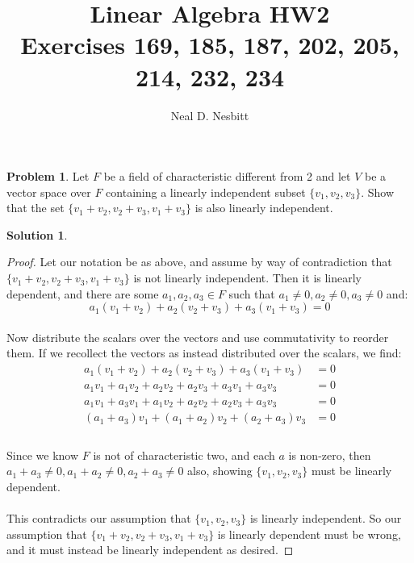 \documentclass{article}
\title{Linear Algebra HW2\\
Exercises 169, 185, 187, 202, 205, 214, 232, 234}
\author{Neal D. Nesbitt}
\begin{document}
\maketitle

\theoremstyle{definition}
\newtheorem{problem}{Problem}[section]
\newtheorem{solution}{Solution}[problem]
\renewcommand{\thesolution}{\theproblem}

\setcounter{section}{5}
\setcounter{problem}{168}
\begin{problem}
Let $F$ be a field of characteristic different from 2 and let $V$ be  a vector space over $F$ containing a linearly independent subset $\{ v_{1}, v_{2}, v_{3} \}$. Show that the set $\{ v_{1}+v_{2}, v_{2}+v_{3}, v_{1}+v_{3} \}$ is also linearly independent.
\end{problem}

\begin{solution}
\begin{proof}
Let our notation be as above, and assume by way of contradiction that $\{ v_{1}+v_{2}, v_{2}+v_{3}, v_{1}+v_{3} \}$ is not linearly independent. Then it is linearly dependent, and there are some $a_{1},a_{2},a_{3} \in F$ such that $a_{1} \ne 0, a_{2} \ne 0, a_{3} \ne 0$ and:
\[ a_{1}( v_{1}+v_{2} ) +a_{2}( v_{2}+v_{3} ) +a_{3}( v_{1}+v_{3} ) = 0 \]

\paragraph{}
Now distribute the scalars over the vectors and use commutativity to reorder them. If we recollect the vectors as instead distributed over the scalars, we find:
\begin{align*} 
a_{1}( v_{1}+v_{2} ) +a_{2}( v_{2}+v_{3} ) +a_{3}( v_{1}+v_{3} ) &= 0 \\
a_{1}v_{1} +a_{1}v_{2} +a_{2}v_{2} +a_{2}v_{3} +a_{3}v_{1} +a_{3}v_{3} &= 0 \\
a_{1}v_{1} +a_{3}v_{1} +a_{1}v_{2} +a_{2}v_{2} +a_{2}v_{3} +a_{3}v_{3} &= 0 \\
( a_{1}+a_{3} )v_{1} +( a_{1}+a_{2} )v_{2} +( a_{2}+a_{3} )v_{3} &= 0 \\
\end{align*}

\paragraph{}
Since we know $F$ is not of characteristic two, and each $a$ is non-zero, then $a_{1}+a_{3} \ne 0, a_{1}+a_{2} \ne 0, a_{2}+a_{3} \ne 0$ also, showing $\{ v_{1}, v_{2}, v_{3} \}$ must be linearly dependent.

\paragraph{}
This contradicts our assumption that $\{ v_{1}, v_{2}, v_{3} \}$ is linearly independent. So our assumption that $\{ v_{1}+v_{2}, v_{2}+v_{3}, v_{1}+v_{3} \}$ is linearly dependent must be wrong, and it must instead be linearly independent as desired.
\end{proof}
\end{solution}
\end{document}
